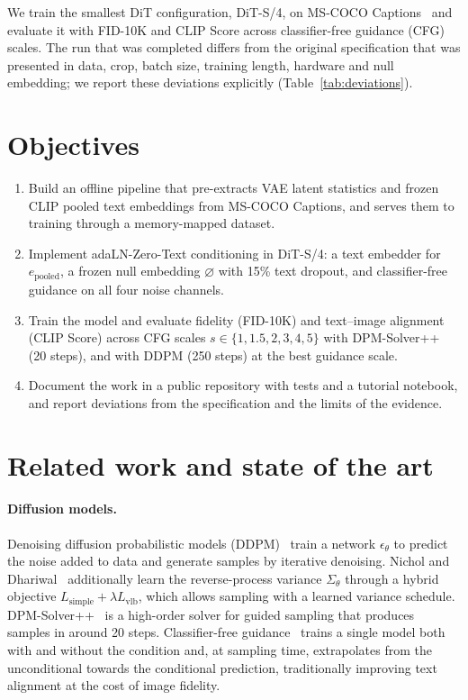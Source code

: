 \documentclass{article}
\newcommand{\nullemb}{\varnothing}
\newcommand{\epooled}{e_{\mathrm{pooled}}}
\begin{document}
We train the smallest DiT configuration, DiT-S/4, on MS-COCO Captions~\cite{lin2014coco} and evaluate it with FID-10K and CLIP Score across classifier-free guidance (CFG) scales.
The run that was completed differs from the original specification that was presented in data, crop, batch size, training length, hardware and null embedding; we report these deviations explicitly (Table~\ref{tab:deviations}).

\section{Objectives}

\begin{enumerate}
  \item Build an offline pipeline that pre-extracts VAE latent statistics and frozen CLIP pooled text embeddings from MS-COCO Captions, and serves them to training through a memory-mapped dataset.
  \item Implement adaLN-Zero-Text conditioning in DiT-S/4: a text embedder for $\epooled$, a frozen null embedding $\nullemb$ with 15\% text dropout, and classifier-free guidance on all four noise channels.
  \item Train the model and evaluate fidelity (FID-10K) and text--image alignment (CLIP Score) across CFG scales $s\in\{1,1.5,2,3,4,5\}$ with DPM-Solver++ (20 steps), and with DDPM (250 steps) at the best guidance scale.
  \item Document the work in a public repository with tests and a tutorial notebook, and report deviations from the specification and the limits of the evidence.
\end{enumerate}

\section{Related work and state of the art}

\paragraph{Diffusion models.}
Denoising diffusion probabilistic models (DDPM)~\cite{ho2020ddpm} train a network $\epsilon_\theta$ to predict the noise added to data and generate samples by iterative denoising.
Nichol and Dhariwal~\cite{nichol2021improved} additionally learn the reverse-process variance $\Sigma_\theta$ through a hybrid objective $L_{\mathrm{simple}}+\lambda L_{\mathrm{vlb}}$, which allows sampling with a learned variance schedule.
DPM-Solver++~\cite{lu2022dpmsolverpp} is a high-order solver for guided sampling that produces samples in around 20 steps.
Classifier-free guidance~\cite{ho2022cfg} trains a single model both with and without the condition and, at sampling time, extrapolates from the unconditional towards the conditional prediction, traditionally improving text alignment at the cost of image fidelity.
\end{document}
